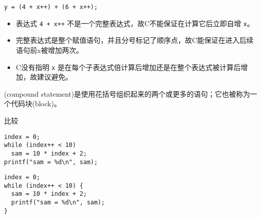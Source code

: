 \begin{frame}[fragile]

\begin{lstlisting}[backgroundcolor=\color{red!10}]
y = (4 + x++) + (6 + x++);
\end{lstlisting}

\begin{itemize}
\item  表达式 \lstinline|4 + x++| 不是一个完整表达式，故C不能保证在计算它后立即自增 \lstinline|x|。\\[0.1in] 
\item 完整表达式是整个赋值语句，并且分号标记了顺序点，故C能保证在进入后续语句前x被增加两次。\\[0.1in] 
\item C没有指明 \lstinline|x| 是在每个子表达式倍计算后增加还是在整个表达式被计算后增加，故建议避免。

\end{itemize}

\end{frame}

\begin{frame}[fragile]
  \begin{defn}[]{}
    (compound statement)是使用花括号组织起来的两个或更多的语句；它也被称为一个代码块(block)。    
  \end{defn}

\end{frame}

\begin{frame}[fragile]
比较
\begin{lstlisting}[backgroundcolor=\color{red!10}]
index = 0;
while (index++ < 10)
  sam = 10 * index + 2;
printf("sam = %d\n", sam);
\end{lstlisting}

\begin{lstlisting}[backgroundcolor=\color{red!10}]
index = 0;
while (index++ < 10) {
  sam = 10 * index + 2;
  printf("sam = %d\n", sam);
}
\end{lstlisting}
\end{frame}
